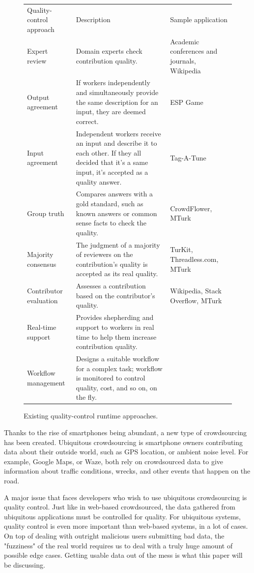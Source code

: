 \documentclass[9pt,twocolumn]{article}
\begin{document}
	\begin{figure}
		\label{fig-tbl2}
		\caption{Existing quality-control runtime approaches.}
		\begin{tabularx}{\textwidth}{||lXX|}
			\rowcolor{gray!50}
			\hline
			Quality-control approach & Description & Sample application \\
			Expert review & Domain experts check contribution quality. & Academic conferences and journals, Wikipedia \\
			Output agreement 		& If workers independently and simultaneously provide the same description for an input, they are deemed correct. & ESP Game \\
			Input agreement 		& Independent workers receive an input and describe it to each other.
			If they all decided that it's a same input, it's accepted as a quality answer. & Tag-A-Tune \\
			Group truth 			& Compares answers with a gold standard, such as known answers or common sense facts to check the quality. & CrowdFlower, MTurk \\
			Majority consensus 		& The judgment of a majority of reviewers on the contribution's quality is accepted as its real quality. & TurKit, Threadless.com, MTurk \\
			Contributor evaluation 	& Assesses a contribution based on the contributor's quality. & Wikipedia, Stack Overflow, MTurk \\
			Real-time support 		& Provides shepherding and support to workers in real time to help them increase contribution quality. & \\
			Workflow management 	& Designs a suitable workflow for a complex task; workflow is monitored to control quality, cost, and so on, on the fly. & \\
			 \hline
		\end{tabularx}
	\end{figure}
	
	Thanks to the rise of smartphones being abundant, a new type of crowdsourcing has been created. Ubiquitous crowdsourcing is smartphone owners contributing data about their outside world, such as GPS location, or ambient noise level. For example, Google Maps, or Waze, both rely on crowdsourced data to give information about traffic conditions, wrecks, and other events that happen on the road. 
	
	A major issue that faces developers who wish to use ubiquitous crowdsourcing is quality control. Just like in web-based crowdsourced, the data gathered from ubiquitous applications must be controlled for quality. For ubiquitous systems, quality control is even more important than web-based systems, in a lot of cases. On top of dealing with outright malicious users submitting bad data, the "fuzziness" of the real world requires us to deal with a truly huge amount of possible edge cases. Getting usable data out of the mess is what this paper will be discussing.
	
\end{document}
